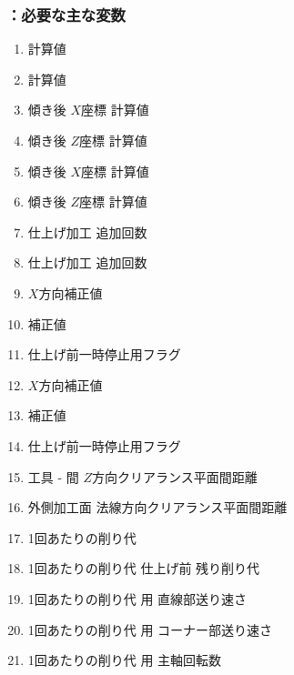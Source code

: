 \subsubsection{\KEndFaceCurvedOutCChamferRLeft：必要な主な変数}
\begin{enumerate}[label*=\sarrow]
\item \TopCurvedOutcutAngle{} 計算値
\item \BottomCurvedOutcutAngle{} 計算値
\item 傾き後 \TopSideCurvedOutcutCenter{} $X$座標{} 計算値
\item 傾き後 \TopSideCurvedOutcutCenter{} $Z$座標{} 計算値
\item 傾き後 \BottomSideCurvedOutcutCenter{} $X$座標{} 計算値
\item 傾き後 \BottomSideCurvedOutcutCenter{} $Z$座標{} 計算値
\item \TopEndFaceOutCChamfer{} 仕上げ加工 追加回数
\item \BottomEndFaceOutCChamfer{} 仕上げ加工 追加回数
\item \TopEndFaceOutCChamfer$X$方向補正値
\item \TopEndFaceOutCChamferWidth 補正値
\item \TopEndFaceOutCChamfer{} 仕上げ前一時停止用フラグ
\item \BottomEndFaceOutCChamfer$X$方向補正値
\item \BottomEndFaceOutCChamferWidth 補正値
\item \BottomEndFaceOutCChamfer{} 仕上げ前一時停止用フラグ
\item 工具 - \EndFace 間 $Z$方向クリアランス平面間距離
\item 外側加工面 法線方向クリアランス平面間距離
\item \EndFaceOutCChamferMilling1回あたりの削り代
\item \EndFaceOutCChamferMilling1回あたりの削り代{} 仕上げ前 残り削り代
\item \EndFaceOutCChamferMilling1回あたりの削り代 用 直線部送り速さ
\item \EndFaceOutCChamferMilling1回あたりの削り代 用 コーナー部送り速さ
\item \EndFaceOutCChamferMilling1回あたりの削り代 用 主軸回転数
\end{enumerate}


